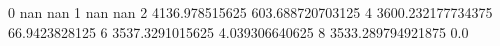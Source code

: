 0 nan nan
1 nan nan
2 4136.978515625 603.688720703125
4 3600.232177734375 66.9423828125
6 3537.3291015625 4.039306640625
8 3533.289794921875 0.0
